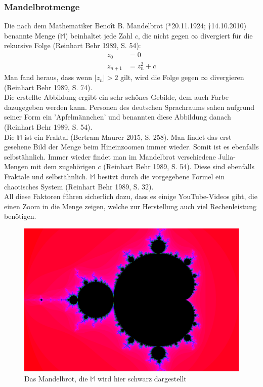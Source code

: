 \subsubsection{Mandelbrotmenge}
Die nach dem Mathematiker Benoît B. Mandelbrot (*20.11.1924; †14.10.2010) benannte Menge ($\mathbb{M}$) beinhaltet jede Zahl $c$, die nicht gegen $\infty$ divergiert für die rekursive Folge (Reinhart Behr 1989, S. 54):
\begin{align*}
z_0&=0\\
z_{n+1}&=z^2_n+c
\end{align*}
Man fand heraus, dass wenn $|z_n| > 2$ gilt, wird die Folge gegen $\infty$ divergieren (Reinhart Behr 1989, S. 74).\\
Die erstellte Abbildung ergibt ein sehr schönes Gebilde, dem auch Farbe dazugegeben werden kann. Personen des deutschen Sprachraums sahen aufgrund seiner Form ein ’Apfelmännchen’ und benannten diese Abbildung danach (Reinhart Behr 1989, S. 54).\\
Die $\mathbb{M}$ ist ein Fraktal (Bertram Maurer 2015, S. 258). Man findet das erst gesehene Bild der Menge beim Hineinzoomen immer wieder. Somit ist es ebenfalls selbstähnlich. Immer wieder findet man im Mandelbrot verschiedene Julia-Mengen mit dem zugehörigen $c$ (Reinhart Behr 1989, S. 54). Diese sind ebenfalls Fraktale und selbstähnlich. $\mathbb{M}$ besitzt durch die vorgegebene Formel ein chaotisches System (Reinhart Behr 1989, S. 32).\\
All diese Faktoren führen sicherlich dazu, dass es einige YouTube-Videos gibt, die einen Zoom in die Menge zeigen, welche zur Herstellung auch viel Rechenleistung benötigen.
\begin{figure}[h]
	\centering
	\includegraphics[width=.5\textwidth]{Pictures/Mandelbrot2668x4002.png}
	\caption{Das Mandelbrot, die $\mathbb{M}$ wird hier schwarz dargestellt}
	\label{fig:Mandelbrot}
\end{figure}
\newpage
